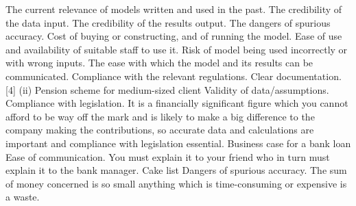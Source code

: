 \documentclass[a4paper,12pt]{article}
\begin{document}
The current relevance of models written and used in the past.
The credibility of the data input.
The credibility of the results output.
The dangers of spurious accuracy.
Cost of buying or constructing, and of running the model.
Ease of use and availability of suitable staff to use it.
Risk of model being used incorrectly or with wrong inputs.
The ease with which the model and its results can be communicated.
Compliance with the relevant regulations.
Clear documentation. [4]
(ii) Pension scheme for medium-sized client
Validity of data/assumptions. Compliance with legislation.
It is a financially significant figure which you cannot afford to be way off the mark and is likely to make a big difference to the company making the contributions, so accurate data and calculations are important and compliance
with legislation essential.
Business case for a bank loan
Ease of communication.
You must explain it to your friend who in turn must explain it to the bank
manager.
Cake list
Dangers of spurious accuracy.
The sum of money concerned is so small anything which is time-consuming or
expensive is a waste. 
\end{document}
